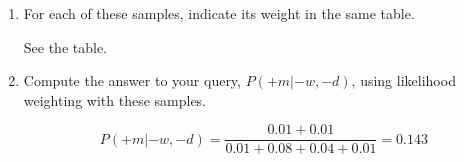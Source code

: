 \documentclass[12pt]{article}
\begin{document}
\begin{enumerate}
\begin{enumerate}
\item For each of these samples, indicate its weight in the same table.

See the table.

\item Compute the answer to your query, $P(+m | -w, -d)$, using
  likelihood weighting with these samples.

\[
  P(+m|-w,-d) = \frac{0.01+0.01}{0.01+0.08+0.04+0.01} = 0.143
\]

\end{enumerate}

\end{enumerate}
\end{document}
